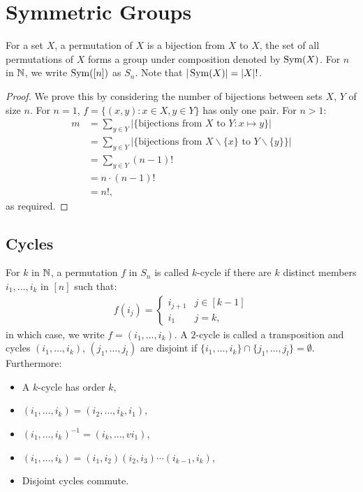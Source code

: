 \section{Symmetric Groups}

For a set $X$, a permutation of $X$ is a bijection from $X$ to $X$,
the set of all permutations of $X$ forms a group under composition
denoted by $\operatorname{Sym}(X)$. For $n$ in $\mathbb{N}$, we write $\operatorname{Sym}([n])$ as $S_n$.
Note that $|\operatorname{Sym}(X)| = |X|!$.

\begin{proof}
    We prove this by considering the number of bijections between sets
    $X$, $Y$ of size $n$. For $n = 1$, $f = \{(x, y) : x \in X, y \in Y\}$
    has only one pair. For $n > 1$: \begin{align*}
        m 
        &= \sum_{y \in Y} |\{\text{bijections from } X \text{ to } Y 
            : x \mapsto y\}| \\
        &= \sum_{y \in Y} |\{\text{bijections from } X \backslash \{x\} 
            \text{ to } Y \backslash \{y\}\}| \\
        &= \sum_{y \in Y} (n - 1)! \\
        &= n \cdot (n - 1)! \\
        &= n!,
    \end{align*} as required.
\end{proof}

\subsection{Cycles}

For $k$ in $\mathbb{N}$, a permutation $f$ in $S_n$ is called $k$-cycle if
there are $k$ distinct members $i_1, \ldots, i_k$ in $[n]$ such that:
\begin{align*}
    f(i_j) = \begin{cases}
        i_{j + 1} & j \in [k - 1] \\
        i_1 & j = k,
    \end{cases}
\end{align*} in which case, we write $f = (i_1, \ldots, i_k)$.
A $2$-cycle is called a transposition and cycles 
$(i_1, \ldots, i_k)$, $(j_1, \ldots, j_l)$
are disjoint if $\{i_1, \ldots, i_k\} \cap \{j_1, \ldots, j_l\} = \emptyset$.
Furthermore: \begin{itemize}
    \item A $k$-cycle has order $k$,
    \item $(i_1, \ldots, i_k) = (i_2, \ldots, i_k, i_1)$,
    \item $(i_1, \ldots, i_k)^{-1} = (i_k, \ldots,v i_1)$,
    \item $(i_1, \ldots, i_k) = (i_1, i_2)(i_2, i_3) \cdots (i_{k - 1}, i_k)$,
    \item Disjoint cycles commute.
\end{itemize} 

